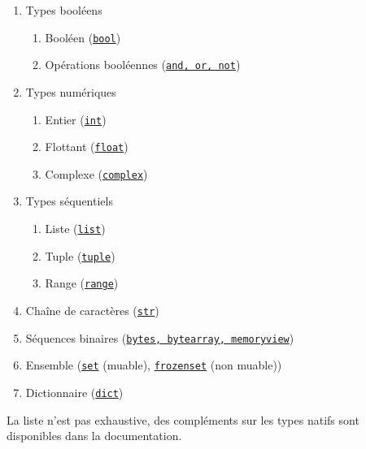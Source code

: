 \documentclass[a4paper, 10pt]{article}
\newcommand{\code}[1]{{\small\texttt{#1}}}
\begin{document}
\begin{enumerate}
		\item Types booléens
		\begin{enumerate}
			\item Booléen (\href{https://docs.python.org/fr/3/library/functions.html?highlight=bool#bool}{\code{bool}})
			\item Opérations booléennes (\href{https://docs.python.org/fr/3/library/stdtypes.html#boolean-operations-and-or-not}{\code{and, or, not}})
		\end{enumerate}
        \item Types numériques
        \begin{enumerate}
              \item Entier (\href{https://docs.python.org/fr/3/library/stdtypes.html#typesnumeric}{\code{int}})
              \item Flottant (\href{https://docs.python.org/fr/3/library/stdtypes.html#typesnumeric}{\code{float}})
              \item Complexe (\href{https://docs.python.org/fr/3/library/stdtypes.html#typesnumeric}{\code{complex}})
      \end{enumerate}
     \item Types séquentiels
	\begin{enumerate}
       \item Liste (\href{https://docs.python.org/fr/3/library/stdtypes.html#sequence-types-list-tuple-range}{\code{list}})
		\item Tuple (\href{https://docs.python.org/fr/3/library/stdtypes.html#sequence-types-list-tuple-range}{\code{tuple}})
		\item Range (\href{https://docs.python.org/fr/3/library/stdtypes.html#sequence-types-list-tuple-range}{\code{range}})
	\end{enumerate}
        \item Chaîne de caractères (\href{https://docs.python.org/fr/3/library/string.html?highlight=str#module-string}{\code{str}})
		\item Séquences binaires (\href{https://docs.python.org/fr/3/library/stdtypes.html#binary-sequence-types-bytes-bytearray-memoryview}{\code{bytes, bytearray, memoryview}})
		\item Ensemble (\href{https://docs.python.org/fr/3/library/stdtypes.html#set-types-set-frozenset}{\code{set}} (muable), \href{https://docs.python.org/fr/3/library/stdtypes.html#set-types-set-frozenset}{\code{frozenset}} (non muable))
		\item Dictionnaire (\href{https://docs.python.org/fr/3/library/stdtypes.html#mapping-types-dict}{\code{dict}})
\end{enumerate}
La liste n'est pas exhaustive, des compléments sur les types natifs sont disponibles dans la documentation.
\end{document}
